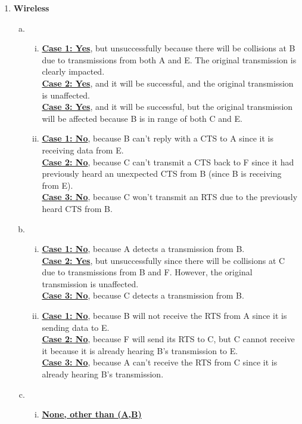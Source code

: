 \documentclass[11pt,fleqn]{article}
\begin{document}
\begin{enumerate}[Q1.]
\newpage
\item \textbf{Wireless}
\begin{enumerate}[(a)]
\item
\begin{enumerate}[i.]
\item \textbf{\underline{Case 1: Yes}}, but unsuccessfully because there will be collisions at B due to transmissions from both A and E. The original transmission is clearly impacted. \\
\textbf{\underline{Case 2: Yes}}, and it will be successful, and the original transmission is unaffected. \\
\textbf{\underline{Case 3: Yes}}, and it will be successful, but the original transmission will be affected because B is in range of both C and E.
\item \textbf{\underline{Case 1: No}}, because B can't reply with a CTS to A since it is receiving data from E. \\
\textbf{\underline{Case 2: No}}, because C can't transmit a CTS back to F since it had previously heard an unexpected CTS from B (since B is receiving from E). \\
\textbf{\underline{Case 3: No}}, because C won't transmit an RTS due to the previously heard CTS from B.
\end{enumerate}
\item
\begin{enumerate}[i.]
\item \textbf{\underline{Case 1: No}}, because A detects a transmission from B. \\
\textbf{\underline{Case 2: Yes}}, but unsuccessfully since there will be collisions at C due to transmissions from B and F. However, the original transmission is unaffected. \\
\textbf{\underline{Case 3: No}}, because C detects a transmission from B.
\item \textbf{\underline{Case 1: No}}, because B will not receive the RTS from A since it is sending data to E. \\
\textbf{\underline{Case 2: No}}, because F will send its RTS to C, but C cannot receive it because it is already hearing B's transmission to E. \\
\textbf{\underline{Case 3: No}}, because A can't receive the RTS from C since it is already hearing B's transmission.
\end{enumerate}
\item
\begin{enumerate}[i.]
\item \textbf{\underline{None, other than (A,B)}}

\end{enumerate}
\end{enumerate}
\end{enumerate}
\end{document}
